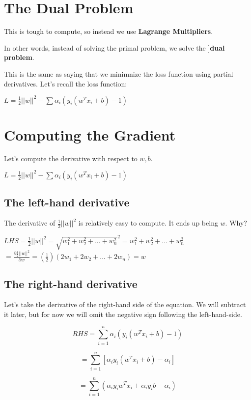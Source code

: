 \section{The Dual Problem}

This is tough to compute, so instead we use \textbf{Lagrange Multipliers}.

In other words, instead of solving the primal problem, we solve the ]\textbf{dual problem}.

This is the same as saying that we minimnize the loss function using partial derivatives. Let's recall the loss function: 

\(L = \frac{1}{2}||w||^2 - \sum \alpha_i (y_i( w^T x_i + b) - 1)\)



\section{Computing the Gradient}
Let's compute the derivative with respect to \(w,b\).

\(L = \frac{1}{2}||w||^2 - \sum \alpha_i (y_i( w^T x_i + b) - 1)\)

\subsection{The left-hand derivative}
The derivative of \(\frac{1}{2}||w||^2\) is relatively easy to compute. It ends up being \(w\).
Why? 

\(LHS = \frac{1}{2}||w||^2 = \sqrt{w_1^2 + w_2^2 + ... + w_n^2}^2 = w_1^2 + w_2^2 + ... + w_n^2\) \\



\( = \frac{\partial\frac{1}{2}||w||^2}{\partial w} = (\frac{1}{2}) (2w_1 + 2w_2 + ... + 2w_n) = w \)


\subsection{The right-hand derivative}
Let's take the derivative of the right-hand side of the equation. We will subtract it later, but for now we will omit the negative sign following the left-hand-side.

\[RHS =  \sum_{i=1}^{n} \alpha_i(y_i(w^Tx_i+b)-1) \]

\[ = \sum_{i=1}^{n} [\alpha_iy_i(w^Tx_i+b)-\alpha_i]\]

\[ = \sum_{i=1}^{n} ( \alpha_iy_iw^Tx_i + \alpha_i y_i b - \alpha_i )\]

